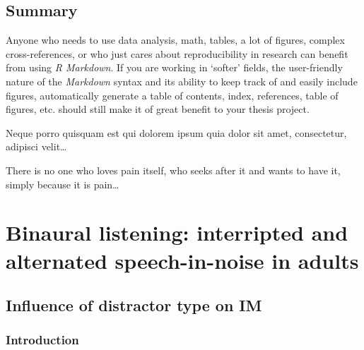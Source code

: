\documentclass[a4paper, twoside]{templates/ociamthesis}
\begin{document}
\hypertarget{summary}{%
\section*{Summary}\label{summary}}

Anyone who needs to use data analysis, math, tables, a lot of figures, complex cross-references, or who just cares about reproducibility in research can benefit from using \emph{R Markdown}.
If you are working in `softer' fields, the user-friendly nature of the \emph{Markdown} syntax and its ability to keep track of and easily include figures, automatically generate a table of contents, index, references, table of figures, etc. should still make it of great benefit to your thesis project.

\begin{savequote}
Neque porro quisquam est qui dolorem ipsum quia dolor sit amet,
consectetur, adipisci velit\ldots{}

There is no one who loves pain itself, who seeks after it and wants to
have it, simply because it is pain\ldots{}
\end{savequote}



\hypertarget{Chpt1}{%
\chapter{Binaural listening: interripted and alternated speech-in-noise in adults}\label{Chpt1}}

\minitoc 

\hypertarget{influence-of-distractor-type-on-im}{%
\section{Influence of distractor type on IM}\label{influence-of-distractor-type-on-im}}

\hypertarget{introduction-1}{%
\subsection{Introduction}\label{introduction-1}}
\end{document}
